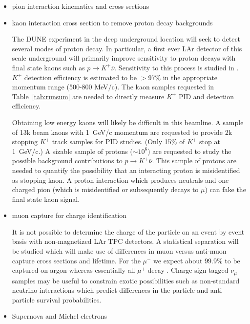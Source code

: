 \begin{itemize}
\item pion interaction kinematics and cross sections
\item kaon interaction cross section to remove proton decay backgrounds


The DUNE experiment in the deep underground location will seek to detect several modes of proton decay.
In particular, a first ever LAr detector of this scale underground will primarily improve sensitivity to 
proton decays with final state kaons such as  ${p \rightarrow K^+ \overline{\nu}}$. 
Sensitivity to this process is studied in \cite{bueno}. $K^+$ detection efficiency is estimated to be $>$97\% in the
appropriate momentum range (500-800 MeV/c). The kaon samples requested in Table~\ref{tab:runsum} are needed to directly measure 
$K^+$ PID and detection efficiency. 

Obtaining low energy kaons will likely be difficult in this beamline.
A sample of 13k beam kaons with 1~GeV/c momentum are requested to provide 2k stopping $K^+$ track samples for PID studies.
(Only 15\% of $K^+$ stop at 1~GeV/c.)
A sizable sample of protons ($\sim 10^6$)
are requested to study the possible background contributions to  $p \rightarrow K^+ \overline{\nu}$.
This sample of  protons are needed to quantify the possibility that an interacting proton 
is  misidentified as stopping kaon. A proton interaction which produces neutrals and one charged pion 
(which is misidentified or subsequently decays to $\mu$) can fake the final state kaon signal.


\item muon capture for charge identification

It is not possible to determine the charge of the particle on an event by event basis with non-magnetized LAr TPC detectors. A statistical separation will be studied which will make use of differences in muon versus anti-muon capture cross sections and lifetime.
For the $\mu^-$ we expect about 99.9\% to be captured on argon whereas essentially all $\mu^+$ decay \cite{stopmu}.
Charge-sign tagged $\nu_\mu$ samples may be useful to constrain exotic possibilities such as
non-standard neutrino interactions which predict differences in the particle and anti-particle survival probabilities. 

\item Supernova and Michel electrons


\end{itemize}
